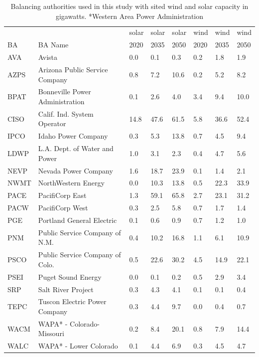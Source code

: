 \documentclass{agujournal2019}
\begin{document}
\begin{table}
\begin{tabular}{llllllll}
     &                                        & solar & solar & solar & wind & wind & wind \\
BA   & BA Name                                & 2020  & 2035  & 2050  & 2020 & 2035 & 2050 \\\hline
AVA  & Avista                                 &   0.0 & 0.1 & 0.3 & 0.2 & 1.8 & 1.9  \\
AZPS & Arizona Public Service Company         &   0.8 & 7.2 & 10.6 & 0.2 & 5.2 & 8.2  \\
BPAT & Bonneville Power Administration        &   0.1 & 2.6 & 4.0 & 3.4 & 9.4 & 10.0  \\
CISO & Calif. Ind. System Operator            &   14.8 & 47.6 & 61.5 & 5.8 & 36.6 & 52.4  \\
IPCO & Idaho Power Company                    &   0.3 & 5.3 & 13.8 & 0.7 & 4.5 & 9.4  \\
LDWP & L.A. Dept. of Water and Power          &   1.0 & 3.1 & 2.3 & 0.4 & 4.7 & 5.6  \\
NEVP & Nevada Power Company                   &   1.6 & 18.7 & 23.9 & 0.1 & 1.4 & 2.1  \\
NWMT & NorthWestern Energy                    &   0.0 & 10.3 & 13.8 & 0.5 & 22.3 & 33.9  \\
PACE & PacifiCorp East                        &   1.3 & 59.1 & 65.8 & 2.7 & 23.1 & 31.2  \\
PACW & PacifiCorp West                        &   0.3 & 2.5 & 5.8 & 0.7 & 1.7 & 1.4  \\
PGE  & Portland General Electric              &   0.1 & 0.6 & 0.9 & 0.7 & 1.2 & 1.0  \\
PNM  & Public Service Company of N.M.         &   0.4 & 10.2 & 16.8 & 1.1 & 6.1 & 10.9  \\
PSCO & Public Service Company of Colo.        &   0.5 & 22.6 & 30.2 & 4.5 & 14.9 & 22.1  \\
PSEI & Puget Sound Energy                     &   0.0 & 0.1 & 0.2 & 0.5 & 2.9 & 3.4  \\
SRP  & Salt River Project                     &   0.3 & 4.3 & 4.1 & 0.1 & 0.1 & 0.4  \\
TEPC & Tuscon Electric Power Company          &   0.3 & 4.4 & 9.7 & 0.0 & 0.4 & 0.7  \\
WACM & WAPA* - Colorado-Missouri               &  0.2 & 8.4 & 20.1 & 0.8 & 7.9 & 14.4   \\
WALC & WAPA* - Lower Colorado                  &  0.1 & 4.4 & 6.9 & 0.3 & 4.5 & 4.7  \\
\hline
\end{tabular}
\caption{Balancing authorities used in this study with sited wind and solar capacity in gigawatts. *Western Area Power Administration}
\label{tab:bas}
\end{table}
\end{document}

